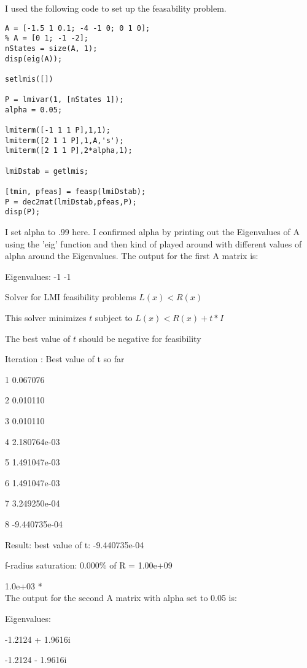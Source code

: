 \documentclass[12pt, letterpaper]{article}
\begin{document}
I used the following code to set up the feasability problem.

\begin{lstlisting}[style=matlabstyle]
A = [-1.5 1 0.1; -4 -1 0; 0 1 0];
% A = [0 1; -1 -2];
nStates = size(A, 1);
disp(eig(A));

setlmis([])

P = lmivar(1, [nStates 1]);
alpha = 0.05;

lmiterm([-1 1 1 P],1,1);
lmiterm([2 1 1 P],1,A,'s');
lmiterm([2 1 1 P],2*alpha,1);

lmiDstab = getlmis;

[tmin, pfeas] = feasp(lmiDstab);
P = dec2mat(lmiDstab,pfeas,P);
disp(P);    
\end{lstlisting}

I set alpha to .99 here.
I confirmed alpha by printing out the Eigenvalues of A using the 'eig' function and then kind of played around with different values of alpha around the Eigenvalues.
The output for the first A matrix is:

Eigenvalues:
-1
-1

Solver for LMI feasibility problems $L(x) < R(x)$

This solver minimizes  $t$  subject to  $L(x) < R(x) + t*I$

The best value of $t$ should be negative for feasibility

Iteration   :    Best value of t so far 

1                        0.067076

2                        0.010110

3                        0.010110

4                    2.180764e-03

5                    1.491047e-03

6                    1.491047e-03

7                    3.249250e-04

8                    -9.440735e-04

Result:  best value of t: -9.440735e-04

f-radius saturation:  0.000\% of R =  1.00e+09

1.0e+03 * \\


The output for the second A matrix  with alpha set to 0.05 is:

Eigenvalues:

-1.2124 + 1.9616i

-1.2124 - 1.9616i
\end{document}
